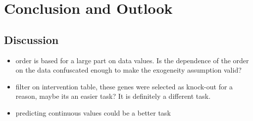 \newpage
\section{Conclusion and Outlook}



\subsection{Discussion}
\begin{itemize}
    \item order is based for a large part on data values. Is the dependence of the order on the data confuscated enough to make the exogeneity assumption valid?
    \item filter on intervention table, these genes were selected as knock-out for a reason, maybe its an easier task? It is definitely a different task.
    \item predicting continuous values could be a better task
\end{itemize}
